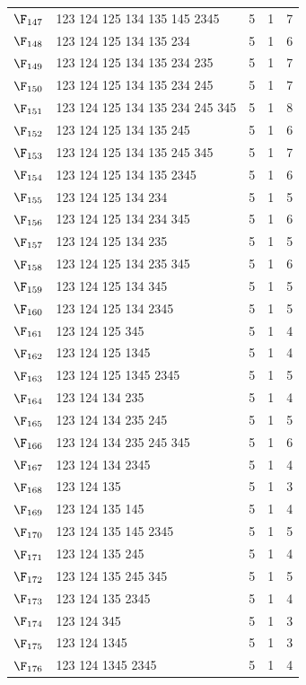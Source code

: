 {\begin{longtable}{c p{7cm} c c c}
$\F_{147}$ & 123 124 125 134 135 145 2345 & 5 & 1 & 7 \\
$\F_{148}$ & 123 124 125 134 135 234 & 5 & 1 & 6 \\
$\F_{149}$ & 123 124 125 134 135 234 235 & 5 & 1 & 7 \\
$\F_{150}$ & 123 124 125 134 135 234 245 & 5 & 1 & 7 \\
$\F_{151}$ & 123 124 125 134 135 234 245 345 & 5 & 1 & 8 \\
$\F_{152}$ & 123 124 125 134 135 245 & 5 & 1 & 6 \\
$\F_{153}$ & 123 124 125 134 135 245 345 & 5 & 1 & 7 \\
$\F_{154}$ & 123 124 125 134 135 2345 & 5 & 1 & 6 \\
$\F_{155}$ & 123 124 125 134 234 & 5 & 1 & 5 \\
$\F_{156}$ & 123 124 125 134 234 345 & 5 & 1 & 6 \\
$\F_{157}$ & 123 124 125 134 235 & 5 & 1 & 5 \\
$\F_{158}$ & 123 124 125 134 235 345 & 5 & 1 & 6 \\
$\F_{159}$ & 123 124 125 134 345 & 5 & 1 & 5 \\
$\F_{160}$ & 123 124 125 134 2345 & 5 & 1 & 5 \\
$\F_{161}$ & 123 124 125 345 & 5 & 1 & 4 \\
$\F_{162}$ & 123 124 125 1345 & 5 & 1 & 4 \\
$\F_{163}$ & 123 124 125 1345 2345 & 5 & 1 & 5 \\
$\F_{164}$ & 123 124 134 235 & 5 & 1 & 4 \\
$\F_{165}$ & 123 124 134 235 245 & 5 & 1 & 5 \\
$\F_{166}$ & 123 124 134 235 245 345 & 5 & 1 & 6 \\
$\F_{167}$ & 123 124 134 2345 & 5 & 1 & 4 \\
$\F_{168}$ & 123 124 135 & 5 & 1 & 3 \\
$\F_{169}$ & 123 124 135 145 & 5 & 1 & 4 \\
$\F_{170}$ & 123 124 135 145 2345 & 5 & 1 & 5 \\
$\F_{171}$ & 123 124 135 245 & 5 & 1 & 4 \\
$\F_{172}$ & 123 124 135 245 345 & 5 & 1 & 5 \\
$\F_{173}$ & 123 124 135 2345 & 5 & 1 & 4 \\
$\F_{174}$ & 123 124 345 & 5 & 1 & 3 \\
$\F_{175}$ & 123 124 1345 & 5 & 1 & 3 \\
$\F_{176}$ & 123 124 1345 2345 & 5 & 1 & 4 \\

\end{longtable}}
